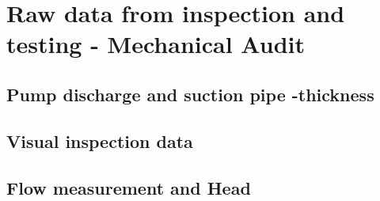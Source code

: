 \chapter{Raw data from inspection and testing - Mechanical Audit}\label{rawdatamech}

\section{Pump discharge and suction pipe -thickness} \label{appthicknesss}

\section{Visual inspection data} \label{appvisualinspectionmech}


\section{Flow measurement and Head} \label{appflow}

